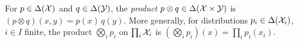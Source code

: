 \begin{definition}
  \label{def:prod}
  \leanok
  For $p \in \Delta(\mathcal X)$ and $q \in \Delta(\mathcal Y)$, the \emph{product} $p \otimes q \in \Delta(\mathcal X \times \mathcal Y)$
  is $(p \otimes q)(x, y) = p(x)\, q(y)$.  More generally, for distributions $p_i \in \Delta(\mathcal X_i)$,
  $i \in I$ finite, the product $\bigotimes_i p_i$ on $\prod_i \mathcal X_i$ is
  $(\bigotimes_i p_i)(x) = \prod_i p_i(x_i)$.
\end{definition}
